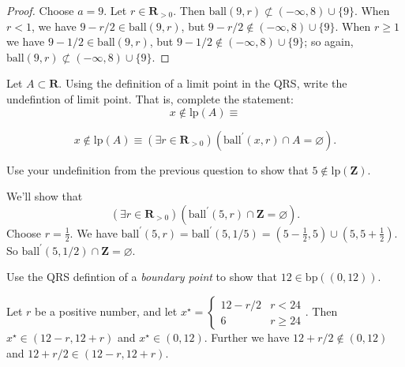 \documentclass[12pt, fleqn]{exam}
\newcommand{\reals}{\mathbf{R}}
\newcommand{\integers}{\mathbf{Z}}
\newcommand{\bp}{\mathrm{bp}}
\newcommand{\lp}{\mathrm{lp}}
\newcommand{\ball}{\mathrm{ball}}
\begin{document}
\begin{questions}
\begin{solution}
\begin{proof}
Choose $a = 9$. Let $r \in \reals_{>0}$. Then $\ball(9,r) \not \subset (-\infty, 8) \cup \{9 \}$.
When $r < 1$, we have $9-r/2 \in \ball(9,r)$, but $9-r/2 \notin (-\infty, 8) \cup \{9 \}$. 
When $r \geq 1$ we have $9-1/2  \in \ball(9,r)$, but $9-1/2 \notin (-\infty, 8) \cup \{9 \}$;
so again, $\ball(9,r) \not \subset (-\infty, 8) \cup \{9 \}$.
\end{proof}
\end{solution}
\question Let $A \subset \reals$.  Using the definition of a limit point in the QRS, write
the undefintion of limit point. That is, complete the statement:
\begin{equation*}
  x \not \in \lp(A) \equiv 
\end{equation*}

\begin{solution}
  \begin{equation*}
    x \not \in \lp(A) \equiv  \left(\exists r \in \reals_{>0} \right)
    \left(\ball^\prime(x,r) \cap A = \varnothing \right).
  \end{equation*}
\end{solution}
\question  Use your undefinition from the previous question to show that \(5 \notin  \lp (\integers)\).


\begin{solution}%
  We'll show that
  \begin{equation*}
  \left(\exists r \in \reals_{>0} \right)
  \left(\ball^\prime(5,r) \cap \integers = \varnothing \right).
  \end{equation*}
  Choose $r = \frac{1}{2}$. We have $\ball^\prime(5,r) = \ball^\prime(5,1/5) 
  = (5-\frac{1}{2}, 5) \cup (5, 5+\frac{1}{2})$. So $\ball^\prime(5,1/2)
  \cap \integers = \varnothing$.
  

\end{solution}

\question  Use the QRS defintion of a \emph{boundary point} to show that $12 \in \bp((0,12))$.


\begin{solution}%
Let \(r\) be a positive number, and let \(x^\star = \begin{cases} 12 - r/2 & r < 24 \\
                                                                      6  & r \geq 24 
\end{cases}\). Then \(x^\star \in (12-r, 12+ r)\) and \(x^\star \in (0,12)\). Further
we have \(12 + r /2 \notin (0,12)\) and \(12 + r/2 \in (12-r, 12+ r)\).


\end{solution}
\end{questions}
\end{document}
